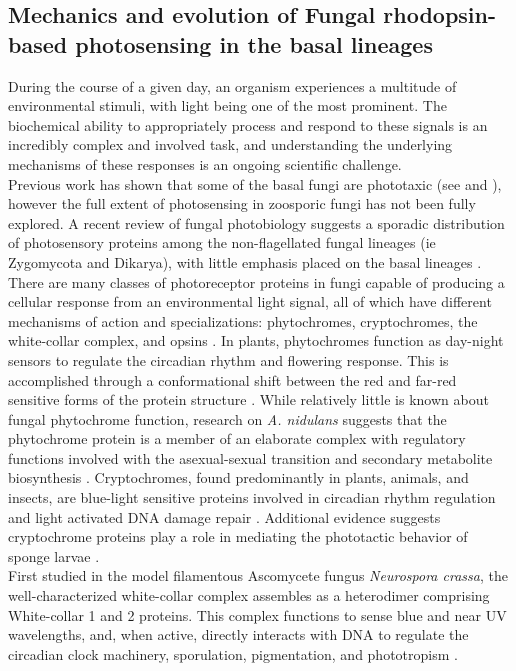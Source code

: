 \subsection*{Mechanics and evolution of Fungal rhodopsin-based photosensing in the basal lineages}
\indent During the course of a given day, an organism experiences a
multitude of environmental stimuli, with light being one of the most
prominent. The biochemical ability to appropriately process and
respond to these signals is an incredibly complex and involved task,
and understanding the underlying mechanisms of these responses is an
ongoing scientific challenge. \\
\indent Previous work has shown that some of the basal fungi are
phototaxic (see \cite{Saranak1997} and \cite{Muehlstein1987}), however
the full extent of photosensing in zoosporic fungi has not been fully
explored. A recent review of fungal photobiology suggests a sporadic
distribution of photosensory proteins among the non-flagellated fungal
lineages (ie Zygomycota and Dikarya), with little emphasis placed on
the basal lineages \cite{Idnurm2010}. There are many classes of
photoreceptor proteins in fungi capable of producing a cellular
response from an environmental light signal, all of which have
different mechanisms of action and specializations: phytochromes,
cryptochromes, the white-collar complex, and opsins
\cite{Idnurm2010}. In plants, phytochromes function as day-night
sensors to regulate the circadian rhythm and flowering response. This
is accomplished through a conformational shift between the red and
far-red sensitive forms of the protein structure
\cite{Rockwell2006}. While relatively little is known about fungal
phytochrome function, research on \textit{A. nidulans} suggests that
the phytochrome protein is a member of an elaborate complex with
regulatory functions involved with the asexual-sexual transition and
secondary metabolite biosynthesis \cite{Idnurm2010}. Cryptochromes,
found predominantly in plants, animals, and insects, are blue-light
sensitive proteins involved in circadian rhythm regulation and light
activated DNA damage repair \cite{Idnurm2010}. Additional evidence
suggests cryptochrome proteins play a role in mediating the
phototactic behavior of sponge larvae \cite{Rivera2012}.\\
\indent First studied in the model filamentous Ascomycete fungus \textit{Neurospora crassa}, the well-characterized white-collar complex assembles as a heterodimer comprising White-collar 1 and 2 proteins. This complex functions to sense blue and near UV wavelengths, and, when active, directly interacts with DNA to regulate the circadian clock machinery, sporulation, pigmentation, and phototropism \cite{Ballario1997,Purschwitz2006,Corrochano2007}. \\
